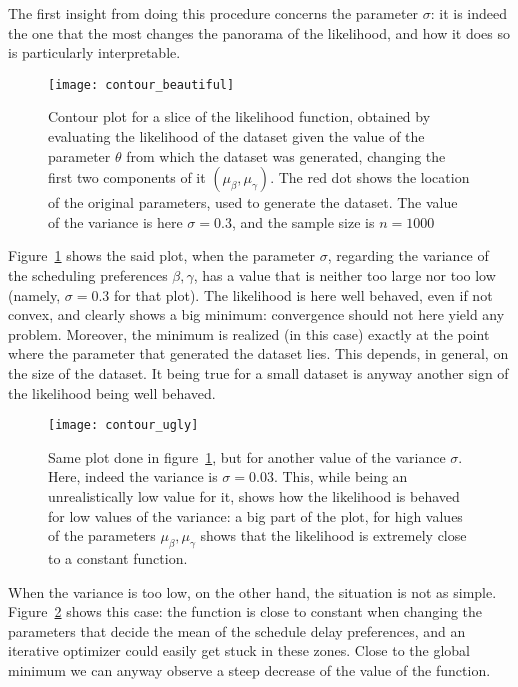 The first insight from doing this procedure concerns the parameter \(\sigma\):
it is indeed the one that the most changes the panorama of the likelihood,
and how it does so is particularly interpretable.

\begin{figure}
  \centering
  \texttt{[image: contour\_beautiful]}
  \caption{Contour plot for a slice of the likelihood function,
    obtained by evaluating the likelihood of the dataset given the value of the parameter \(\theta\) from which the dataset was generated,
    changing the first two components of it \((\mu_\beta, \mu_\gamma)\).
    The red dot shows the location of the original parameters, used to generate the dataset.
    The value of the variance is here \(\sigma = 0.3\),
  and the sample size is \(n = 1000\)}
  \label{fig:contour_mid_var}
\end{figure}

Figure~\ref{fig:contour_mid_var} shows the said plot,
when the parameter \(\sigma\), regarding the variance of the scheduling preferences \(\beta, \gamma\),
has a value that is neither too large nor too low (namely, \(\sigma = 0.3\) for that plot).
The likelihood is here well behaved,
even if not convex, and clearly shows a big minimum:
convergence should not here yield any problem.
Moreover, the minimum is realized (in this case) exactly at the point where the parameter that generated the dataset lies.
This depends, in general, on the size of the dataset.
It being true for a small dataset is anyway another sign of the likelihood being well behaved.

\begin{figure}
  \centering
  \texttt{[image: contour\_ugly]}
  \caption{Same plot done in figure~\ref{fig:contour_mid_var}, but for another value of the variance \(\sigma\).
    Here, indeed the variance is \(\sigma = 0.03\).
    This, while being an unrealistically low value for it, shows how the likelihood is behaved for low values of the variance:
    a big part of the plot,
  for high values of the parameters \(\mu_\beta, \mu_\gamma\) shows that the likelihood is extremely close to a constant function.}
  \label{fig:contour_low_var}
\end{figure}

When the variance is too low, on the other hand,
the situation is not as simple.
Figure~\ref{fig:contour_low_var} shows this case:
the function is close to constant when changing the parameters that decide the mean of the schedule delay preferences,
and an iterative optimizer could easily get stuck in these zones.
Close to the global minimum we can anyway observe a steep decrease of the value of the function.

